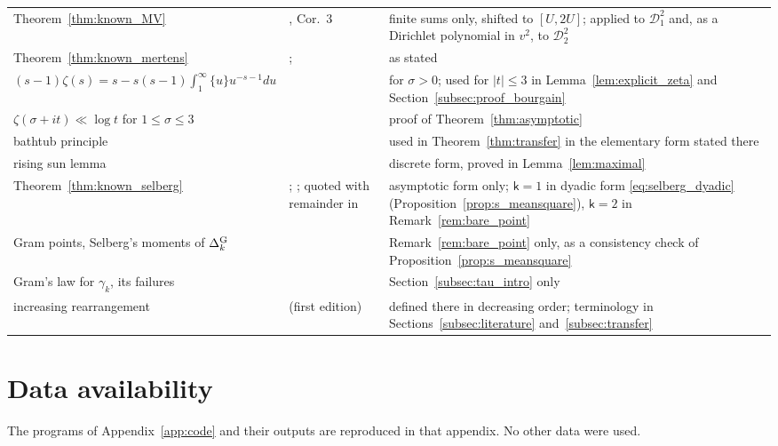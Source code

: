 \documentclass[11pt,a4paper]{article}
\makeatletter
\numberwithin{equation}{section}
\DeclareRobustCommand{\CGref}[1]{\ref{#1}}
\DeclareRobustCommand{\CGeqref}[1]{\eqref{#1}}
\DeclareRobustCommand{\CGcite}[2][]{\if\relax\detokenize{#1}\relax\cite{#2}\else\cite[#1]{#2}\fi}
\let\CG@origref\ref
\let\CG@origeqref\eqref
\newcommand{\CG@gettip}[1]{\@ifundefined{CGTip@#1}{#1}{\csname CGTip@#1\endcsname}}
\newcommand{\CG@getbib}[1]{\@ifundefined{CGBib@#1}{#1}{\csname CGBib@#1\endcsname}}
\DeclareRobustCommand{\CGref}[1]{\pdftooltip{\CG@origref{#1}}{\CG@gettip{#1}}}
\DeclareRobustCommand{\CGeqref}[1]{\pdftooltip{\CG@origeqref{#1}}{\CG@gettip{#1}}}
\DeclareRobustCommand{\CGcite}[2][]{\pdftooltip{\if\relax\detokenize{#1}\relax\cite{#2}\else\cite[#1]{#2}\fi}{\CG@getbib{#2}}}
\theoremstyle{definition}
\theoremstyle{remark}
\makeatother
\begin{document}
\begin{center}
\begin{longtable}{p{}p{}p{}}
Theorem~\CGref{thm:known_MV} & \CGcite{MontgomeryVaughan1974}, Cor.~3 & finite sums only, shifted to $[U,2U]$; applied to $\mathscr D_1^2$ and, as a Dirichlet polynomial in $v^2$, to $\mathscr D_2^2$\\
Theorem~\CGref{thm:known_mertens} & \CGcite{Mertens1874}; \CGcite[Ch.~I.1]{Tenenbaum2015} & as stated\\
$(s-1)\zeta(s)=s-s(s-1)\int_1^\infty\{u\}u^{-s-1}du$ & \CGcite[(2.1.4)]{Titchmarsh1986} & for $\sigma>0$; used for $|t|\le3$ in Lemma~\CGref{lem:explicit_zeta} and Section~\CGref{subsec:proof_bourgain}\\
$\zeta(\sigma+it)\ll\log t$ for $1\le\sigma\le3$ & \CGcite[Thm.~3.5]{Titchmarsh1986} & proof of Theorem~\CGref{thm:asymptotic}\\
bathtub principle & \CGcite[Thm.~1.14]{LiebLoss2001} & used in Theorem~\CGref{thm:transfer} in the elementary form stated there\\
rising sun lemma & \CGcite{Riesz1932} & discrete form, proved in Lemma~\CGref{lem:maximal}\\
Theorem~\CGref{thm:known_selberg} & \CGcite{Selberg1946a}; \CGcite[Notes for Chapter~9, (9.25.1), p.~245]{Titchmarsh1986}; quoted with remainder in \CGcite[p.~225]{Fujii1974} & asymptotic form only; $\mathsf k=1$ in dyadic form \CGeqref{eq:selberg_dyadic} (Proposition~\CGref{prop:s_meansquare}), $\mathsf k=2$ in Remark~\CGref{rem:bare_point}\\
Gram points, Selberg's moments of $\Delta^{\rm G}_k$ & \CGcite[Thm.~4.2]{Korolev2012} & Remark~\CGref{rem:bare_point} only, as a consistency check of Proposition~\CGref{prop:s_meansquare}\\
Gram's law for $\gamma_k$, its failures & \CGcite[Def.~1.4 and p.~58]{Korolev2012} & Section~\CGref{subsec:tau_intro} only\\
increasing rearrangement & \CGcite[\S10.12, pp.~276--278]{HardyLittlewoodPolya1934} (first edition) & defined there in decreasing order; terminology in Sections~\CGref{subsec:literature} and~\CGref{subsec:transfer}\\
\end{longtable}
\end{center}

\section*{Data availability}
The programs of Appendix~\CGref{app:code} and their outputs are reproduced in that appendix. No other data were used.
\end{document}
